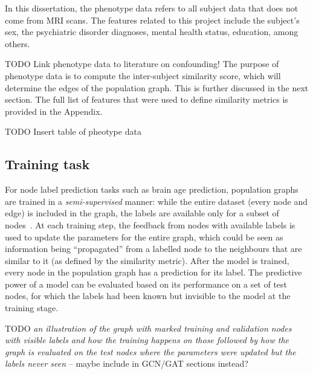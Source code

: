In this dissertation, the phenotype data refers to all subject data that does not come from MRI scans. The features related to this project include the subject's sex, the psychiatric disorder diagnoses, mental health status, education, among others.

TODO Link phenotype data to literature on confounding!
The purpose of phenotype data is to compute the inter-subject similarity score, which will determine the edges of the population graph. This is further discussed in the next section. The full list of features that were used to define similarity metrics is provided in the Appendix.

TODO Insert table of pheotype data




\subsection{Training task}
\label{training-task}


For node label prediction tasks such as brain age prediction, population graphs are trained in a \textit{semi-supervised} manner: while the entire dataset (every node and edge) is included in the graph, the labels are available only for a subset of nodes~\cite{kipf2017semi}. At each training step, the feedback from nodes with available labels is used to update the parameters for the entire graph, which could be seen as information being ``propagated'' from a labelled node to the neighbours that are similar to it (as defined by the similarity metric). After the model is trained, every node in the population graph has a prediction for its label. The predictive power of a model can be evaluated based on its performance on a set of test nodes, for which the labels had been known but invisible to the model at the training stage.


TODO \textit{an illustration of the graph with marked training and validation nodes with visible labels and how the training happens on those followed by how the graph is evaluated on the test nodes where the parameters were updated but the labels never seen} – maybe include in GCN/GAT sections instead?

